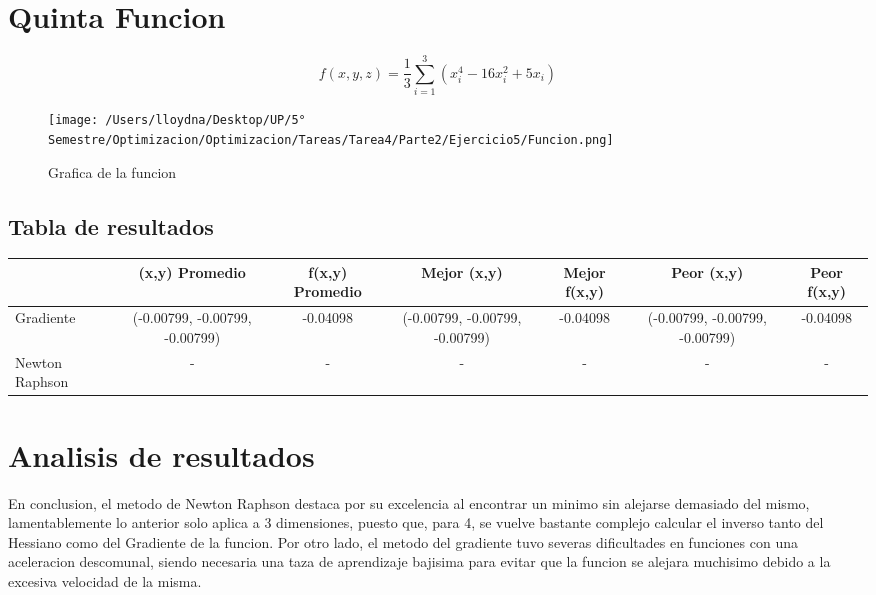 \documentclass{report}
\begin{document}
        \section{Quinta Funcion}
            \begin{equation*}
                f(x,y,z)=\frac{1}{3}\sum_{i=1}^{3}(x_{i}^4-16x_{i}^2+5x_{i})
            \end{equation*}

            \begin{figure}[H]
                \texttt{[image: /Users/lloydna/Desktop/UP/5° Semestre/Optimizacion/Optimizacion/Tareas/Tarea4/Parte2/Ejercicio5/Funcion.png]}
                \caption{Grafica de la funcion}
                \label{fig:fun15}
            \end{figure}

            \subsection{Tabla de resultados}
            \begin{tabular}{l|c|c|c|c|c|c}
                & (x,y) Promedio & f(x,y) Promedio & Mejor (x,y) & Mejor f(x,y) & Peor (x,y) & Peor f(x,y)\\
                \hline
                Gradiente & (-0.00799, -0.00799, -0.00799) & -0.04098 & (-0.00799, -0.00799, -0.00799) & -0.04098 & (-0.00799, -0.00799, -0.00799) & -0.04098\\
                \hline
                Newton Raphson & - & - & - & - & - & - \\
                \hline
            \end{tabular}
        \pagebreak

        \section{Analisis de resultados}
        En conclusion, el metodo de Newton Raphson destaca por su excelencia al encontrar un minimo sin alejarse demasiado del mismo, lamentablemente
        lo anterior solo aplica a 3 dimensiones, puesto que, para 4, se vuelve bastante complejo calcular el inverso tanto del Hessiano como del Gradiente
        de la funcion.
        Por otro lado, el metodo del gradiente tuvo severas dificultades en funciones con una aceleracion descomunal, siendo necesaria una taza de aprendizaje
        bajisima para evitar que la funcion se alejara muchisimo debido a la excesiva velocidad de la misma.
\end{document}
